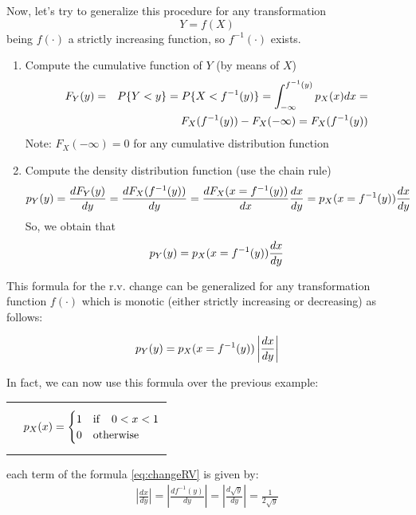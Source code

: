 Now, let's try to generalize this procedure for any transformation
$$ Y = f(X) $$
being $f(\cdot)$ a strictly increasing function, so $f^{-1}(\cdot)$ exists.
\begin{enumerate}
    \item Compute the cumulative function of $Y$ (by means of $X$)
    \begin{eqnarray} 
    F_Y(y)  &= &  P\{Y<y\} =  P\{X<f^{-1}(y)\} = \int_{-\infty}^{f^{-1}(y)} p_X(x) dx = \nonumber \\ 
    & & F_X(f^{-1}(y)) - F_X(-\infty) = F_X(f^{-1}(y)) \nonumber
    \end{eqnarray} 
  Note: $F_X(-\infty) = 0$ for any cumulative distribution function  
    \item Compute the density distribution function (use the chain rule)
    \begin{eqnarray} 
    p_Y(y) = \frac{d F_Y(y)}{dy} =  \frac{d F_X(f^{-1}(y))}{dy} = \frac{d F_X(x= f^{-1}(y))}{dx}  \frac{dx}{dy} = p_X(x= f^{-1}(y)) \frac{dx}{dy} \nonumber
    \end{eqnarray} 
    So, we obtain that 
    \begin{eqnarray}  p_Y(y) = p_X(x= f^{-1}(y)) \frac{dx}{dy}  \nonumber \end{eqnarray} 
\end{enumerate}

This formula for the r.v. change can be generalized for any transformation function $f(\cdot)$ which is monotic (either strictly increasing or decreasing) as follows:
\begin{svgraybox}
\begin{equation} 
p_Y(y) = p_X(x = f^{-1}(y))  \left| \frac{dx}{dy}\right| \label{eq:changeRV}
\end{equation} 
\end{svgraybox}

In fact, we can now use this formula over the previous example:
\begin{center}
\begin{tabular}{m{}m{}}
 \raisebox{-0.25ex}{$ Y = X^2$} &
 \begin{equation} 
p_X(x) = \begin{cases}
1 & {\rm if} \quad 0<x<1\\
0 & {\rm otherwise} 
\end{cases} \nonumber
\end{equation}
\end{tabular}
\end{center}
each term of the formula \eqref{eq:changeRV} is given by:
\begin{eqnarray} 
\left| \frac{dx}{dy}\right| = \left| \frac{df^{-1}(y)}{dy}\right| = \left| \frac{d\sqrt{y}}{dy}\right| = \frac{1}{2\sqrt{y}} \nonumber
\end{eqnarray} 

